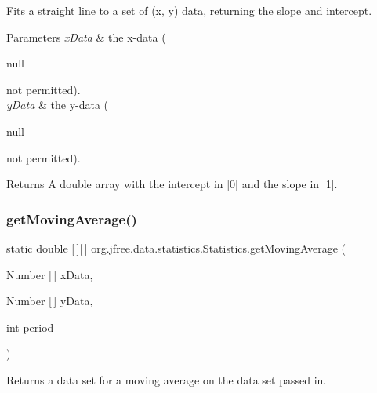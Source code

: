 Fits a straight line to a set of (x, y) data, returning the slope and intercept.


\begin{DoxyParams}{Parameters}
{\em x\+Data} & the x-\/data (
\begin{DoxyCode}
null 
\end{DoxyCode}
 not permitted). \\
\hline
{\em y\+Data} & the y-\/data (
\begin{DoxyCode}
null 
\end{DoxyCode}
 not permitted).\\
\hline
\end{DoxyParams}
\begin{DoxyReturn}{Returns}
A double array with the intercept in \mbox{[}0\mbox{]} and the slope in \mbox{[}1\mbox{]}. 
\end{DoxyReturn}
\mbox{\label{classorg_1_1jfree_1_1data_1_1statistics_1_1_statistics_a0226b7b4d5998983761091e1c31e46e7}} 
\subsubsection{\texorpdfstring{get\+Moving\+Average()}{getMovingAverage()}}
{\footnotesize\ttfamily static double \mbox{[}$\,$\mbox{]}\mbox{[}$\,$\mbox{]} org.\+jfree.\+data.\+statistics.\+Statistics.\+get\+Moving\+Average (\begin{DoxyParamCaption}\item[{Number \mbox{[}$\,$\mbox{]}}]{x\+Data,  }\item[{Number \mbox{[}$\,$\mbox{]}}]{y\+Data,  }\item[{int}]{period }\end{DoxyParamCaption})\hspace{0.3cm}{\ttfamily [static]}}

Returns a data set for a moving average on the data set passed in.


